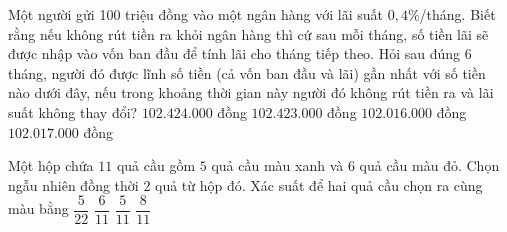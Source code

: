 \documentclass[12pt,a4paper,twoside]{book}
\begin{document}
\begin{ex}%
	Một người gửi 100 triệu đồng vào một ngân hàng với lãi suất $0,4\%$/tháng. Biết rằng nếu không rút tiền ra khỏi ngân hàng thì cứ sau mỗi tháng, số tiền lãi sẽ được nhập vào vốn ban đầu để tính lãi cho tháng tiếp theo. Hỏi sau đúng 6 tháng, người đó được lĩnh số tiền (cả vốn ban đầu và lãi) gần nhất với số tiền nào dưới đây, nếu trong khoảng thời gian này người đó không rút tiền  ra và lãi suất không thay đổi?
	\choice
	{\True $102.424.000$ đồng}
	{$102.423.000$ đồng}
	{$102.016.000$ đồng}
	{$102.017.000$ đồng}
\end{ex}


\begin{ex}%
	Một hộp chứa $11$ quả cầu gồm $5$ quả cầu màu xanh và $6$ quả cầu màu đỏ. Chọn ngẫu nhiên đồng thời $2$ quả từ hộp đó. Xác suất để hai quả cầu chọn ra cùng màu bằng
	\choice
	{$\dfrac{5}{22}$}
	{$\dfrac{6}{11}$}
	{\True $\dfrac{5}{11}$}
	{$\dfrac{8}{11}$}
\end{ex}
\end{document}
